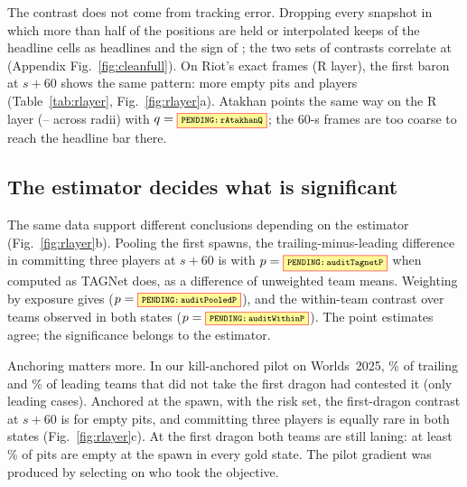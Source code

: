 
The contrast does not come from tracking error.
Dropping every snapshot in which more than half of the positions are held or interpolated keeps  of the  headline cells as headlines and the sign of ; the two sets of contrasts correlate at  (Appendix Fig.~\ref{fig:cleanfull}).
On Riot's exact frames (R layer), the first baron at $s{+}60$ shows the same pattern: \pp{}  more empty pits and   players (Table~\ref{tab:rlayer}, Fig.~\ref{fig:rlayer}a).
Atakhan points the same way on the R layer (--\pp{} across radii) with $q=\V{rAtakhanQ}$; the 60-s frames are too coarse to reach the headline bar there.

\subsection{The estimator decides what is significant}
\label{sec:audit}


The same data support different conclusions depending on the estimator (Fig.~\ref{fig:rlayer}b).
Pooling the first spawns, the trailing-minus-leading difference in committing three players at $s{+}60$ is \pp{}  with $p=\V{auditTagnetP}$ when computed as TAGNet does, as a difference of unweighted team means.
Weighting by exposure gives \pp{} ($p=\V{auditPooledP}$), and the within-team contrast over teams observed in both states \pp{} ($p=\V{auditWithinP}$).
The point estimates agree; the significance belongs to the estimator.

Anchoring matters more.
In our kill-anchored pilot on Worlds~2025, \% of trailing and \% of leading teams that did not take the first dragon had contested it (only  leading cases).
Anchored at the spawn, with the risk set, the first-dragon contrast at $s{+}60$ is \pp{}  for empty pits, and committing three players is equally rare in both states (Fig.~\ref{fig:rlayer}c).
At the first dragon both teams are still laning: at least \% of pits are empty at the spawn in every gold state.
The pilot gradient was produced by selecting on who took the objective.

